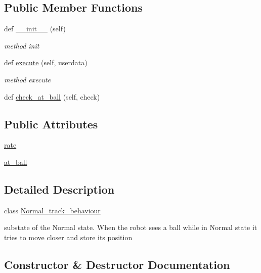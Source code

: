 \subsection*{Public Member Functions}
\begin{DoxyCompactItemize}
\item 
def \hyperlink{classbehavior__manager_1_1Normal__track__behaviour_ad442bd3a8b510459e8271075e1e7f8f1}{\+\_\+\+\_\+init\+\_\+\+\_\+} (self)
\begin{DoxyCompactList}\small\item\em method init \end{DoxyCompactList}\item 
def \hyperlink{classbehavior__manager_1_1Normal__track__behaviour_a3bbad6b9c6733364eacf193d387c2397}{execute} (self, userdata)
\begin{DoxyCompactList}\small\item\em method execute \end{DoxyCompactList}\item 
def \hyperlink{classbehavior__manager_1_1Normal__track__behaviour_a1e37969e88239c54d307769f1bb042ab}{check\+\_\+at\+\_\+ball} (self, check)
\end{DoxyCompactItemize}
\subsection*{Public Attributes}
\begin{DoxyCompactItemize}
\item 
\hyperlink{classbehavior__manager_1_1Normal__track__behaviour_a208545700e8ed6da275c4d706f7c1abd}{rate}
\item 
\hyperlink{classbehavior__manager_1_1Normal__track__behaviour_a1c8562aa75539239ac6dc0ac1b286f84}{at\+\_\+ball}
\end{DoxyCompactItemize}


\subsection{Detailed Description}
class \hyperlink{classbehavior__manager_1_1Normal__track__behaviour}{Normal\+\_\+track\+\_\+behaviour} 

substate of the Normal state. When the robot sees a ball while in Normal state it tries to move closer and store its position 

\subsection{Constructor \& Destructor Documentation}
